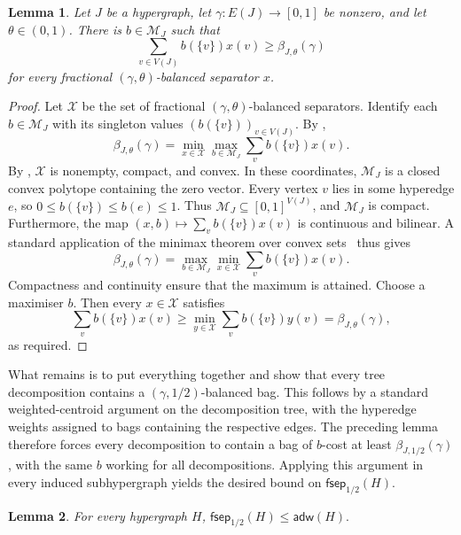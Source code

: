 \documentclass[11pt,letterpaper]{article}
\newtheorem{lemma}[lemma]{Lemma}
\theoremstyle{definition}
\theoremstyle{remark}
\newcommand{\adw}{\mathsf{adw}}
\newcommand{\fsep}{\mathsf{fsep}}
\providecommand{\adw}{\operatorname{adw}}
\begin{document}
\begin{lemma}
\label{lem:cover-minimax}
Let $J$ be a hypergraph, let $\gamma:E(J)\to[0,1]$ be nonzero, and let
$\theta\in(0,1)$.  There
is $b \in \mathcal{M}_J$ such that
\[
 \sum_{v\in V(J)}b(\{v\})x(v)
 \ge \beta_{J,\theta}(\gamma)
\]
for every fractional $(\gamma,\theta)$-balanced separator $x$.
\end{lemma}

\begin{proof}
Let $\mathcal X$ be the set of fractional
$(\gamma,\theta)$-balanced separators. Identify each $b\in\mathcal M_J$
with its singleton values $(b(\{v\}))_{v\in V(J)}$. By ,
\[
 \beta_{J,\theta}(\gamma)
 =\min_{x\in\mathcal X}\max_{b\in\mathcal M_J}\sum_vb(\{v\})x(v).
\]
By , $\mathcal X$ is nonempty,
compact, and convex. In these coordinates, $\mathcal M_J$ is a closed convex
polytope containing the zero vector. Every vertex $v$ lies in some
hyperedge $e$, so $0\le b(\{v\})\le b(e)\le1$. Thus
$\mathcal M_J\subseteq[0,1]^{V(J)}$, and $\mathcal M_J$ is compact. Furthermore, the map
$(x,b)\mapsto\sum_vb(\{v\})x(v)$ is continuous and bilinear. A standard
application of the minimax theorem over convex sets~\cite{Sion58} thus gives
\begin{equation}
 \beta_{J,\theta}(\gamma)
 =\max_{b\in\mathcal M_J}\min_{x\in\mathcal X}\sum_vb(\{v\})x(v).
 \label{eq:separator-minimax}
\end{equation}
Compactness and continuity ensure that the maximum is attained.
Choose a maximiser $b$. Then every $x\in\mathcal X$ satisfies
\[
 \sum_v b(\{v\})x(v)
 \ge \min_{y\in\mathcal X}\sum_v b(\{v\})y(v)
 =\beta_{J,\theta}(\gamma),
\]
as required.
\end{proof}

What remains is to put everything together and show that every tree
decomposition contains a $(\gamma,1/2)$-balanced bag. This follows by a
standard weighted-centroid argument on the decomposition tree, with the
hyperedge weights assigned to bags containing the respective edges.
The preceding lemma therefore forces every decomposition to contain a bag
of $b$-cost at least $\beta_{J,1/2}(\gamma)$, with the same $b$ working for
all decompositions. Applying this argument in every induced subhypergraph
yields the desired bound on $\fsep_{1/2}(H)$.

\begin{lemma}
\label{thm:fsep-adw}
For every hypergraph $H$,
\(
 \fsep_{1/2}(H)\le\adw(H).
\)
\end{lemma}
\end{document}
